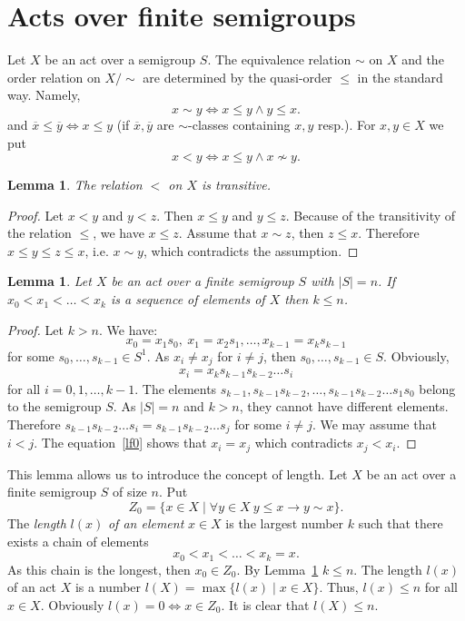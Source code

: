\documentclass{birkau}
\numberwithin{equation}{section}
\theoremstyle{plain}
\newtheorem{lemma}[theorem]{Lemma}
\theoremstyle{definition}
\begin{document}
	\section{Acts over finite semigroups}
	
	Let $X$ be an act over a semigroup $S$. The equivalence relation $\sim$ on $X$ and the order relation on $X/{\sim}$ are determined by the quasi-order $\leqslant$ in the standard way. Namely, $$ x \sim y \Leftrightarrow x \leqslant y \wedge y \leqslant x. $$ and $\overline{x} \leqslant \overline{y} \Leftrightarrow x \leqslant y $ (if $\overline{x}, \overline{y}$ are ${\sim}$-classes containing $x,y$ resp.).
	For $x,y \in X$ we put $$ x < y \Leftrightarrow x \leqslant y \wedge x \nsim y. $$
	
	\begin{lemma} \label{lemma:03}
	    The relation $<$ on $X$ is transitive.
	\end{lemma}
	\begin{proof}
	    Let $x < y$ and $y < z$. Then $x \leqslant y$ and $y \leqslant z$. Because of the transitivity of the relation $\leqslant$, we have $x \leqslant z$. Assume that $x \sim z$, then $z \leqslant x$. Therefore $x \leqslant y \leqslant z \leqslant x$, i.e. $x \sim y$, which contradicts the assumption.
	\end{proof}
	
	\begin{lemma} \label{lemma:04}
	    Let $X$ be an act over a finite semigroup $S$ with $|S| = n$. If $x_0 < x_1 < \ldots < x_k$ is a sequence of elements of $X$ then $k \leqslant n$.
	\end{lemma}
	\begin{proof}
	    Let $k > n$. We have: $$x_0 = x_1 s_0,\ x_1 = x_2s_1, \ldots , x_{k-1} = x_k s_{k-1}$$ for some $s_0,\ldots,s_{k-1} \in S^1$. As $x_i \neq x_j$ for $i \neq j$, then $ s_0,\ldots,s_{k-1} \in S$. Obviously,
		\begin{gather}
			x_i = x_k s_{k-1} s_{k-2} \ldots s_i \label{lf0}
		\end{gather}
		for all $i = 0,1,\ldots,k-1$. The elements $s_{k-1},s_{k-1}s_{k-2},\ldots,s_{k-1}s_{k-2}\ldots s_1s_0$ belong to the semigroup $S$. As $|S| = n$ and $k>n$, they cannot have different elements. Therefore $s_{k-1}s_{k-2}\ldots s_i = s_{k-1}s_{k-2}\ldots s_j$ for some $i\neq j$. We may assume that $i < j$. The equation~\eqref{lf0} shows that $x_i = x_j$ which contradicts $x_j < x_i$.
	\end{proof}
	
	This lemma allows us to introduce the concept of length. Let $X$ be an act over a finite semigroup $S$ of size $n$. Put $$ Z_0 = \{ x \in X \mid \forall y \in X \ y \leqslant x \rightarrow y \sim x \}.$$ The \textit{length} $l(x)$ \textit{of an element} $x \in X$ is the largest number $k$ such that there exists a chain of elements $$x_0 < x_1 < \ldots < x_k=x.$$ As this chain is the longest, then $x_0 \in Z_0$. By Lemma~\ref{lemma:04} $k \leqslant n$. The length $l(x)$ of an act $X$ is a number $l(X) = \max \{ l(x) \mid x \in X\}$. Thus, $l(x) \leqslant n$ for all $x \in X$. Obviously $l(x) = 0 \Leftrightarrow x \in Z_0$. It is clear that $l(X) \leqslant n$.
	
\end{document}
